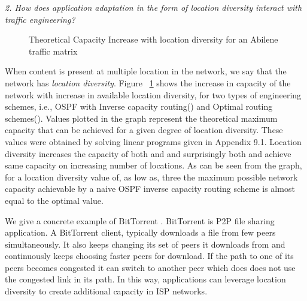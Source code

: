 \emph{2. How does application adaptation in the form of location diversity interact  with traffic engineering?}

\begin{figure}[htb]
	  \caption{\label{fig:capacity_LP} Theoretical Capacity Increase with location diversity for an Abilene traffic matrix}
\end{figure}

When content is present at multiple location in the network, we say that the network has \emph{location diversity}.  Figure ~\ref{fig:capacity_LP} shows the increase in capacity of the network with increase in available location diversity, for two types of engineering schemes, i.e., OSPF with Inverse capacity routing(\invcap{}) and Optimal routing schemes(\opt{}). Values plotted in the graph represent the theoretical maximum capacity that can be achieved for a given degree of location diversity. These values were obtained by solving linear programs given in Appendix 9.1.  Location diversity increases the capacity of both \opt{} and \invcap{} and surprisingly  both \opt{} and \invcap{} achieve same capacity on increasing number of locations.   As can be seen from the graph, for a location diversity value of, as low as, three the maximum possible network capacity achievable by a naive OSPF inverse capacity routing scheme is almost equal to the optimal value.


We give a concrete example of BitTorrent \cite{BitTorrentRef}. BitTorrent is P2P file sharing application. A BitTorrent client, typically downloads a file from few peers simultaneously. It also keeps changing its set of peers it downloads from and continuously keeps choosing faster peers for download. If the path to one of its peers becomes congested it can switch to another peer which does does not use the congested link in its path. In this way, applications can leverage location diversity to create additional capacity in ISP networks. 



